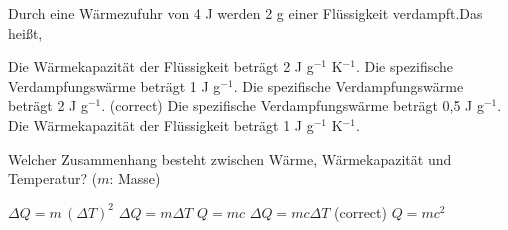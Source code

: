 \documentclass[11pt]{exam}
\begin{document}
\begin{questions}
\vspace{3mm}\question Durch eine Wärmezufuhr von 4 J werden 2 g einer Flüssigkeit verdampft.Das heißt,

\begin{choices}
	\choice Die Wärmekapazität der Flüssigkeit beträgt 2 J g\(^{-1}\) K\(^{-1}\).
	\choice Die spezifische Verdampfungswärme beträgt 1 J g\(^{-1}\).
	\choice Die spezifische Verdampfungswärme beträgt 2 J g\(^{-1}\). (correct)
	\choice Die spezifische Verdampfungswärme beträgt 0,5 J g\(^{-1}\).
	\choice Die Wärmekapazität der Flüssigkeit beträgt 1 J g\(^{-1}\) K\(^{-1}\).
\end{choices}

\vspace{3mm}\question Welcher Zusammenhang besteht zwischen Wärme, Wärmekapazität und Temperatur? (\(m\): Masse)

\begin{choices}
	\choice \(\Delta Q = m \, (\Delta T)^2\)
	\choice \(\Delta Q = m \Delta T\)
	\choice \(Q = m c\)
	\choice \(\Delta Q = m c \Delta T\) (correct)
	\choice \(Q = m c^2\)
\end{choices}

\vspace{3mm}\end{questions}
\end{document}
